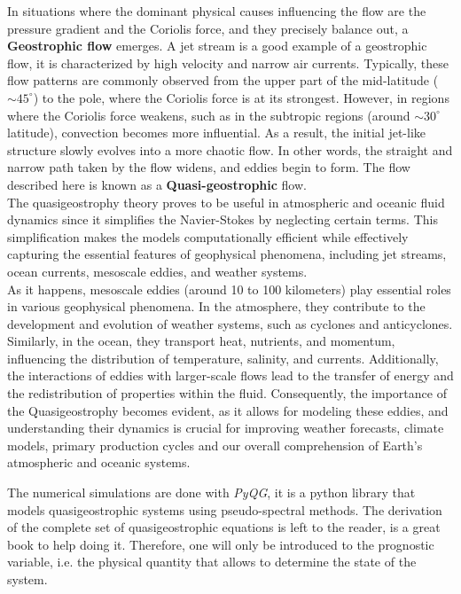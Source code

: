 In situations where the dominant physical causes influencing the flow are the pressure gradient and the Coriolis force, and they precisely balance out, a \textbf{Geostrophic flow} emerges. A jet stream is a good example of a geostrophic flow, it is characterized by high velocity and narrow air currents. Typically, these flow patterns are commonly observed from the upper part of the mid-latitude ($\sim 45^{\circ}$) to the pole, where the Coriolis force is at its strongest. However, in regions where the Coriolis force weakens, such as in the subtropic regions (around $\sim 30^{\circ}$ latitude), convection becomes more influential. As a result, the initial jet-like structure slowly evolves into a more chaotic flow. In other words, the straight and narrow path taken by the flow widens, and eddies begin to form. The flow described here is known as a \textbf{Quasi-geostrophic} flow.\\

The quasigeostrophy theory proves to be useful in atmospheric and oceanic fluid dynamics since it simplifies the Navier-Stokes by neglecting certain terms. This simplification makes the models computationally efficient while effectively capturing the essential features of geophysical phenomena, including jet streams, ocean currents, mesoscale eddies, and weather systems.\\

As it happens, mesoscale eddies (around 10 to 100 kilometers) play essential roles in various geophysical phenomena. In the atmosphere, they contribute to the development and evolution of weather systems, such as cyclones and anticyclones. Similarly, in the ocean, they transport heat, nutrients, and momentum, influencing the distribution of temperature, salinity, and currents. Additionally, the interactions of eddies with larger-scale flows lead to the transfer of energy and the redistribution of properties within the fluid. Consequently, the importance of the Quasigeostrophy becomes evident, as it allows for modeling these eddies, and understanding their dynamics is crucial for improving weather forecasts, climate models, primary production cycles and our overall comprehension of Earth's atmospheric and oceanic systems.

\newpage


The numerical simulations are done with \textit{PyQG}, it is a python library that models quasigeostrophic systems using pseudo-spectral methods. The derivation of the complete set of quasigeostrophic equations is left to the reader, \cite{BookQG} is a great book to help doing it. Therefore, one will only be introduced to the prognostic variable, i.e. the physical quantity that allows to determine the state of the system.\\

